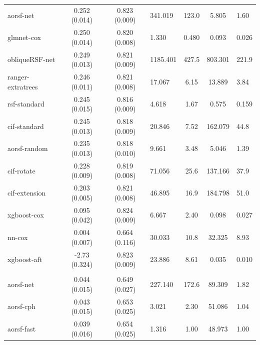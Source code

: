\documentclass[twoside,11pt]{article}\usepackage[]{graphicx}\usepackage[]{xcolor}
\newenvironment{knitrout}{}{} %
\begin{document}
\begin{knitrout}
\begin{longtable}{lcclccl}
\hspace{1em}aorsf-net & 0.252 (0.014) & 0.823 (0.009) & 341.019 & 123.0 & 5.805 & 1.60\\
\hspace{1em}glmnet-cox & 0.250 (0.014) & 0.820 (0.008) & 1.330 & 0.480 & 0.093 & 0.026\\
\hspace{1em}obliqueRSF-net & 0.249 (0.013) & 0.821 (0.009) & 1185.401 & 427.5 & 803.301 & 221.9\\
\hspace{1em}ranger-extratrees & 0.246 (0.011) & 0.821 (0.008) & 17.067 & 6.15 & 13.889 & 3.84\\
\hspace{1em}rsf-standard & 0.245 (0.015) & 0.816 (0.009) & 4.618 & 1.67 & 0.575 & 0.159\\
\hspace{1em}cif-standard & 0.245 (0.013) & 0.818 (0.009) & 20.846 & 7.52 & 162.079 & 44.8\\
\hspace{1em}aorsf-random & 0.235 (0.013) & 0.818 (0.010) & 9.661 & 3.48 & 5.046 & 1.39\\
\hspace{1em}cif-rotate & 0.228 (0.009) & 0.819 (0.008) & 71.056 & 25.6 & 137.166 & 37.9\\
\hspace{1em}cif-extension & 0.203 (0.005) & 0.821 (0.008) & 46.895 & 16.9 & 184.798 & 51.0\\
\hspace{1em}xgboost-cox & 0.095 (0.042) & 0.824 (0.009) & 6.667 & 2.40 & 0.098 & 0.027\\
\hspace{1em}nn-cox & 0.004 (0.007) & 0.664 (0.116) & 30.033 & 10.8 & 32.325 & 8.93\\
\hspace{1em}xgboost-aft & -2.73 (0.324) & 0.823 (0.009) & 23.886 & 8.61 & 0.035 & 0.010\\
\addlinespace[0.3em]
\hline
\multicolumn{7}{l}{\textit{\textbf{sim}}}\\
\hline
\hspace{1em}aorsf-net & 0.044 (0.015) & 0.649 (0.027) & 227.140 & 172.6 & 89.309 & 1.82\\
\hspace{1em}aorsf-cph & 0.043 (0.015) & 0.653 (0.025) & 3.021 & 2.30 & 51.086 & 1.04\\
\hspace{1em}aorsf-fast & 0.039 (0.016) & 0.654 (0.025) & 1.316 & 1.00 & 48.973 & 1.00\\

\end{longtable}
\end{knitrout}
\end{document}
